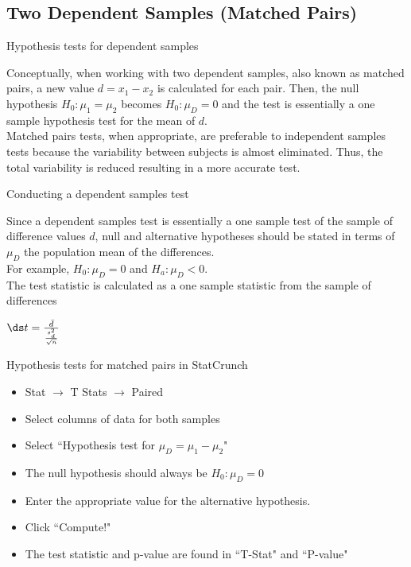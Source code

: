 \documentclass[xcolor=table]{beamer}
\begin{document}
\subsection{Two Dependent Samples (Matched Pairs)}

\begin{frame}{Hypothesis tests for dependent samples}
\begin{block}{}
\large
Conceptually, when working with two dependent samples, also known as matched pairs, a new value $d = x_1 - x_2$ is calculated for each pair. Then, the null hypothesis $H_0: \mu_1 = \mu_2$ becomes $H_0: \mu_D = 0$ and the test is essentially a one sample hypothesis test for the mean of $d$.\\
\pause\medskip
Matched pairs tests, when appropriate, are preferable to independent samples tests because the variability between subjects is almost eliminated. Thus, the total variability is reduced resulting in a more accurate test. 
\end{block}
\end{frame}

\begin{frame}{Conducting a dependent samples test}
\begin{block}{}
\large
Since a dependent samples test is essentially a one sample test of the sample of difference values $d$, null and alternative hypotheses should be stated in terms of $\mu_D$ the population mean of the differences.\\
\pause\medskip
For example, $H_0: \mu_D = 0$ and $H_a: \mu_D < 0$.\\
\pause\medskip
The test statistic is calculated as a one sample statistic from the sample of differences\\
\medskip
{\centering $\ds t = \frac {\bar d}{\frac{s_d^2}{\sqrt{n}}}$ \par}
\medskip
\end{block}
\end{frame}

\begin{frame}{Hypothesis tests for matched pairs in StatCrunch}

\begin{block}{}
\large
\begin{itemize}
\item Stat $\to$ T Stats $\to$ Paired
\item Select columns of data for both samples
\item Select ``Hypothesis test for $\mu_D = \mu_1 - \mu_2$"
\item The null hypothesis should always be $H_0: \mu_D = 0$
\item Enter the appropriate value for the alternative hypothesis.
\item Click ``Compute!"
\item The test statistic and p-value are found in ``T-Stat" and ``P-value"
\end{itemize}
\end{block}

\end{frame}
\end{document}

